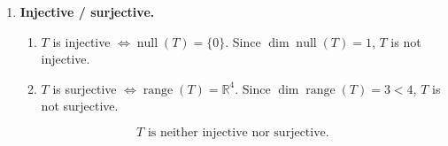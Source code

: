 \documentclass[12pt]{article}
\begin{document}
\begin{enumerate}[label=(\alph*)]
Row-reduce $[T]_{\mathcal{B}}^{\mathcal{A}}$:
\[
\begin{bmatrix}
1&1&0&0\\
0&0&1&1\\
1&0&1&0\\
0&1&0&1
\end{bmatrix}
\overset{R_3\leftarrow R_3-R_1}{\sim}
\begin{bmatrix}
1&1&0&0\\
0&0&1&1\\
0&-1&1&0\\
0&1&0&1
\end{bmatrix}.
\]
\[
\begin{bmatrix}
1&1&0&0\\
0&0&1&1\\
0&-1&1&0\\
0&1&0&1
\end{bmatrix}
\overset{R_3\leftarrow -R_3}{\sim}
\begin{bmatrix}
1&1&0&0\\
0&0&1&1\\
0&1&-1&0\\
0&1&0&1
\end{bmatrix}.
\]
\[
\begin{bmatrix}
1&1&0&0\\
0&0&1&1\\
0&1&-1&0\\
0&1&0&1
\end{bmatrix}
\overset{R_4\leftarrow R_4-R_3}{\sim}
\begin{bmatrix}
1&1&0&0\\
0&0&1&1\\
0&1&-1&0\\
0&0&1&1
\end{bmatrix}.
\]
\[
\begin{bmatrix}
1&1&0&0\\
0&0&1&1\\
0&1&-1&0\\
0&0&1&1
\end{bmatrix}
\overset{R_2\leftarrow R_2-R_4}{\sim}
\begin{bmatrix}
1&1&0&0\\
0&0&0&0\\
0&1&-1&0\\
0&0&1&1
\end{bmatrix}.
\]
There are $3$ pivot rows, hence $\mathrm{rank}(T)=3$ and $\dim\operatorname{range}(T)=3$. (Check: $1+3=4$.)
\[
\boxed{\,\dim\operatorname{null}(T)=1,\qquad \dim\operatorname{range}(T)=3.\,}
\]

\item \textbf{Injective / surjective.}
\begin{enumerate}[label=(\roman*)]
\item $T$ is injective $\iff \operatorname{null}(T)=\{0\}$. Since $\dim\operatorname{null}(T)=1$, $T$ is not injective.
\item $T$ is surjective $\iff \operatorname{range}(T)=\mathbb{R}^4$. Since $\dim\operatorname{range}(T)=3<4$, $T$ is not surjective.
\end{enumerate}
\[
\boxed{\,T\text{ is neither injective nor surjective.}\,}
\]
\end{enumerate}
\newpage
\end{document}
